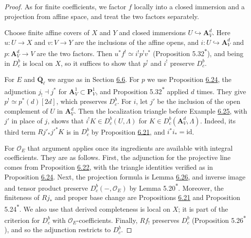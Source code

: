 \documentclass[11pt]{article}
\newcommand{\bpout}[1]{#1\textsuperscript{\hyperlink{bp-outside}{\ensuremath{\ast}}}}
\providecommand{\Dbc}{}\renewcommand{\Dbc}{D^b_c}
\begin{document}
\begin{proof}[{Proof}]\label{bp85}%
As for finite coefficients, we factor \(f\) locally into a closed immersion and a projection from affine space, and treat the two factors separately.

Choose finite affine covers of \(X\) and \(Y\) and closed immersions \(U\hookrightarrow\mathbf A^d_V\). Here \(u:U\to X\) and \(v:V\to Y\) are the inclusions of the affine opens, and \(i:U\hookrightarrow\mathbf A^d_V\) and \(p:\mathbf A^d_V\to V\) are the two factors. Then \(u^*f^!\simeq i^!p^!v^*\) (Proposition \bpout{5.32}), and being in \(\Dbc\) is local on \(X\), so it suffices to show that \(p^!\) and \(i^!\) preserve \(\Dbc\).

For \(E\) and \(\overline{\mathbf Q}_\ell\) we argue as in Section \hyperref[bp56]{6.6}. For \(p\) we use Proposition \hyperref[bp75]{6.24}, the adjunction \(j_!\dashv j^*\) for \(\mathbf A^1_V\subset\mathbf P^1_V\), and Proposition \bpout{5.32} applied \(d\) times. They give \(p^!\simeq p^*(d)[2d]\), which preserves \(\Dbc\). For \(i\), let \(j'\) be the inclusion of the open complement of \(U\) in \(\mathbf A^d_V\). Then the localization triangle before Example \hyperref[bp79]{6.25}, with \(j'\) in place of \(j\), shows that \(i^!K\in\Dbc(U,\Lambda)\) for \(K\in\Dbc(\mathbf A^d_V,\Lambda)\). Indeed, its third term \(Rj'_*j'^*K\) is in \(\Dbc\) by Proposition \hyperref[bp65]{6.21}, and \(i^*i_*=\mathrm{id}\).

For \(\mathcal O_E\) that argument applies once its ingredients are available with integral coefficients. They are as follows. First, the adjunction for the projective line comes from Proposition \hyperref[bp69]{6.22}, with the triangle identities verified as in Proposition \hyperref[bp75]{6.24}. Next, the projection formula is Lemma \hyperref[bp81]{6.26}, and inverse image and tensor product preserve \(\Dbc(-,\mathcal O_E)\) by Lemma \bpout{5.20}. Moreover, the finiteness of \(Rj_*\) and proper base change are Propositions \hyperref[bp65]{6.21} and \bpout{Proposition 5.24}. We also use that derived completeness is local on \(X\); it is part of the criterion for \(\Dbc\) with \(\mathcal O_E\)-coefficients. Finally, \(Rf_!\) preserves \(\Dbc\) (Proposition \bpout{5.26}), and so the adjunction restricts to \(\Dbc\).
\end{proof}



\end{document}
